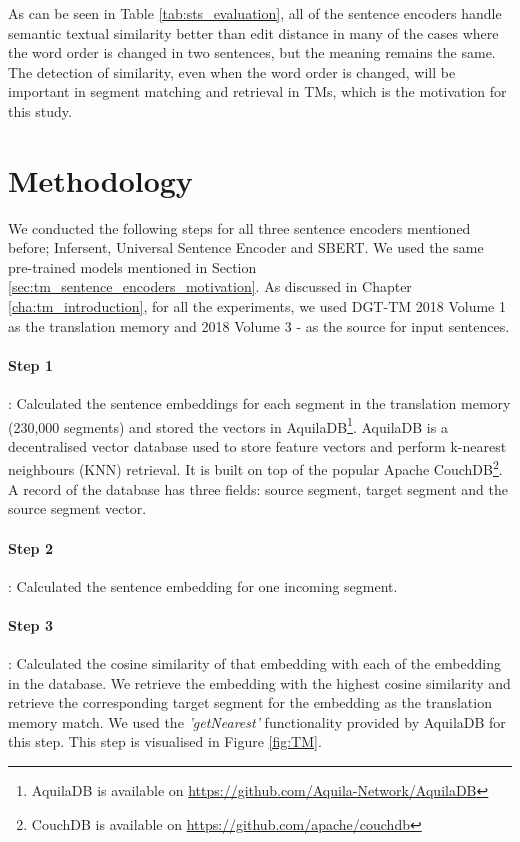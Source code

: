 As can be seen in Table \ref{tab:sts_evaluation}, all of the sentence encoders handle semantic textual similarity better than edit distance in many of the cases where the word order is changed in two sentences, but the meaning remains the same. The detection of similarity, even when the word order is changed, will be important in segment matching and retrieval in TMs, which is the motivation for this study.


\section{Methodology}
\label{sec:tm_sentence_encoders_method}

We conducted the following steps for all three sentence encoders mentioned before; Infersent, Universal Sentence Encoder and SBERT. We used the same pre-trained models mentioned in Section \ref{sec:tm_sentence_encoders_motivation}. As discussed in Chapter \ref{cha:tm_introduction}, for all the experiments, we used DGT-TM 2018 Volume 1 as the translation memory and 2018 Volume 3 - as the source for input sentences. 


	\paragraph{Step 1}: Calculated the sentence embeddings for each segment in the translation memory (230,000 segments) and stored the vectors in AquilaDB\footnote{AquilaDB is available on \url{https://github.com/Aquila-Network/AquilaDB}}. AquilaDB is a decentralised vector database used to store feature vectors and perform k-nearest neighbours (KNN) retrieval. It is built on top of the popular Apache CouchDB\footnote{CouchDB is available on \url{https://github.com/apache/couchdb}}. A record of the database has three fields: source segment, target segment and the source segment vector.
	
	\paragraph{Step 2}: Calculated the sentence embedding for one incoming segment. 
	
	\paragraph{Step 3}: Calculated the cosine similarity of that embedding with each of the embedding in the database. We retrieve the embedding with the highest cosine similarity and retrieve the corresponding target segment for the embedding as the translation memory match. We used the \textit{'getNearest'} functionality provided by AquilaDB for this step. This step is visualised in Figure \ref{fig:TM}.
	
